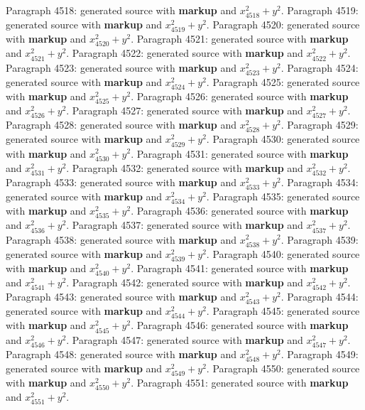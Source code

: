 \documentclass{article}
\begin{document}
Paragraph 4518: generated source with \textbf{markup} and $x_{4518}^2 + y^2$.
Paragraph 4519: generated source with \textbf{markup} and $x_{4519}^2 + y^2$.
Paragraph 4520: generated source with \textbf{markup} and $x_{4520}^2 + y^2$.
Paragraph 4521: generated source with \textbf{markup} and $x_{4521}^2 + y^2$.
Paragraph 4522: generated source with \textbf{markup} and $x_{4522}^2 + y^2$.
Paragraph 4523: generated source with \textbf{markup} and $x_{4523}^2 + y^2$.
Paragraph 4524: generated source with \textbf{markup} and $x_{4524}^2 + y^2$.
Paragraph 4525: generated source with \textbf{markup} and $x_{4525}^2 + y^2$.
Paragraph 4526: generated source with \textbf{markup} and $x_{4526}^2 + y^2$.
Paragraph 4527: generated source with \textbf{markup} and $x_{4527}^2 + y^2$.
Paragraph 4528: generated source with \textbf{markup} and $x_{4528}^2 + y^2$.
Paragraph 4529: generated source with \textbf{markup} and $x_{4529}^2 + y^2$.
Paragraph 4530: generated source with \textbf{markup} and $x_{4530}^2 + y^2$.
Paragraph 4531: generated source with \textbf{markup} and $x_{4531}^2 + y^2$.
Paragraph 4532: generated source with \textbf{markup} and $x_{4532}^2 + y^2$.
Paragraph 4533: generated source with \textbf{markup} and $x_{4533}^2 + y^2$.
Paragraph 4534: generated source with \textbf{markup} and $x_{4534}^2 + y^2$.
Paragraph 4535: generated source with \textbf{markup} and $x_{4535}^2 + y^2$.
Paragraph 4536: generated source with \textbf{markup} and $x_{4536}^2 + y^2$.
Paragraph 4537: generated source with \textbf{markup} and $x_{4537}^2 + y^2$.
Paragraph 4538: generated source with \textbf{markup} and $x_{4538}^2 + y^2$.
Paragraph 4539: generated source with \textbf{markup} and $x_{4539}^2 + y^2$.
Paragraph 4540: generated source with \textbf{markup} and $x_{4540}^2 + y^2$.
Paragraph 4541: generated source with \textbf{markup} and $x_{4541}^2 + y^2$.
Paragraph 4542: generated source with \textbf{markup} and $x_{4542}^2 + y^2$.
Paragraph 4543: generated source with \textbf{markup} and $x_{4543}^2 + y^2$.
Paragraph 4544: generated source with \textbf{markup} and $x_{4544}^2 + y^2$.
Paragraph 4545: generated source with \textbf{markup} and $x_{4545}^2 + y^2$.
Paragraph 4546: generated source with \textbf{markup} and $x_{4546}^2 + y^2$.
Paragraph 4547: generated source with \textbf{markup} and $x_{4547}^2 + y^2$.
Paragraph 4548: generated source with \textbf{markup} and $x_{4548}^2 + y^2$.
Paragraph 4549: generated source with \textbf{markup} and $x_{4549}^2 + y^2$.
Paragraph 4550: generated source with \textbf{markup} and $x_{4550}^2 + y^2$.
Paragraph 4551: generated source with \textbf{markup} and $x_{4551}^2 + y^2$.
\end{document}

